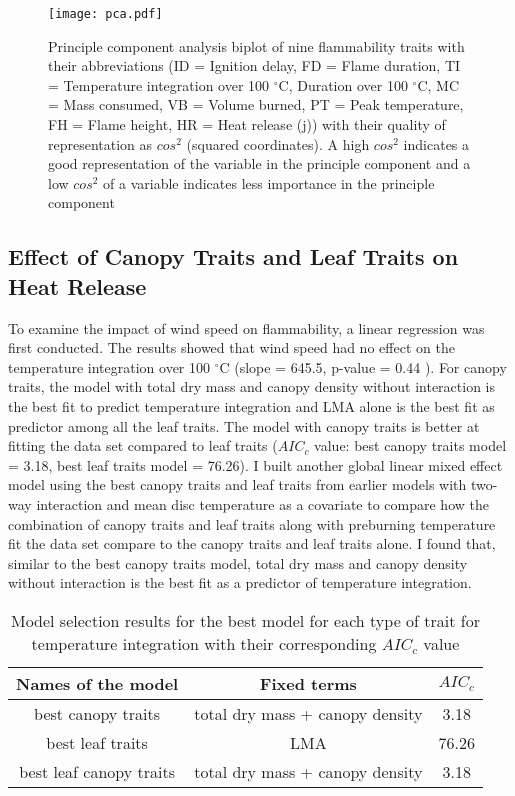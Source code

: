 \documentclass[12pt]{report}
\begin{document}
\begin{figure}
    \centering
    \texttt{[image: pca.pdf]}
    \caption{Principle component analysis biplot of nine flammability traits with their abbreviations (ID = Ignition delay, FD = Flame duration, TI = Temperature integration over 100 $^{\circ}$C, Duration over 100 $^{\circ}$C, MC = Mass consumed, VB = Volume burned, PT = Peak temperature, FH = Flame height, HR = Heat release (j)) with their quality of representation as $cos^2$ (squared coordinates). A high $cos^2$ indicates a good representation of the variable in the principle component and a low $cos^2$ of a variable indicates less importance in the principle component}
\end{figure}

\subsection{Effect of Canopy Traits and Leaf Traits on Heat Release}
To examine the impact of wind speed on flammability, a linear regression was first conducted. The results showed that wind speed had no effect on the temperature integration over 100 $^{\circ}$C  (slope = 645.5, p-value = 0.44 ). For canopy traits, the model with total dry mass and canopy density without interaction is the best fit to predict temperature integration and \MakeUppercase{lma} alone is the best fit as predictor among all the leaf traits. The model with canopy traits is better at fitting the data set compared to leaf traits ($AIC_{c}$ value: best canopy traits model = 3.18, best leaf traits model = 76.26). I built another global linear mixed effect model using the best canopy traits and leaf traits from earlier models with two-way interaction and mean disc temperature as a covariate to compare how the combination of canopy traits and leaf traits along with pre\-burning temperature fit the data set compare to the canopy traits and leaf traits alone. I found that, similar to the best canopy traits model, total dry mass and canopy density without interaction is the best fit as a predictor of temperature integration.

\begin{table}
\centering
\begin{tabular}{|c | c | c|}
       \hline
       \textbf{Names of the model} & \textbf{Fixed terms} & \textbf{$AIC_{c}$} \\
       \hline
       best canopy traits  &total dry mass + canopy density & 3.18 \\
       \hline
       best leaf traits    &LMA & 76.26 \\
       \hline
       best leaf canopy traits   &total dry mass + canopy density & 3.18\\
       \hline
\end{tabular}
\caption{Model selection results for the best model for each type of trait for temperature integration with their corresponding $AIC_{c}$ value}
\end{table} 
\end{document}
